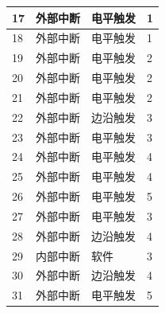 \begin{longtable}[c]{ |p{1.5cm}|p{4.5cm}|p{4.5cm}|p{4cm}| }
    \hline
    17  & 外部中断    & 电平触发   & 1                 \\
    \hline
    18  & 外部中断    & 电平触发   & 1                 \\
    \hline
    19  & 外部中断    & 电平触发   & 2                 \\
    \hline
    20  & 外部中断    & 电平触发   & 2                 \\
    \hline
    21  & 外部中断    & 电平触发   & 2                 \\
    \hline
    22  & 外部中断    & 边沿触发    & 3                 \\
    \hline
    23  & 外部中断    & 电平触发   & 3                 \\
    \hline
    24  & 外部中断    & 电平触发   & 4                 \\
    \hline
    25  & 外部中断    & 电平触发   & 4                 \\
    \hline
    26  & 外部中断    & 电平触发   & 5                 \\
    \hline
    27  & 外部中断    & 电平触发   & 3                 \\
    \hline
    28  & 外部中断    & 边沿触发    & 4                 \\
    \hline
    29  & 内部中断    & 软件          & 3                 \\
    \hline
    30  & 外部中断    & 边沿触发    & 4                 \\
    \hline
    31  & 外部中断    & 电平触发   & 5                 \\

\end{longtable}
